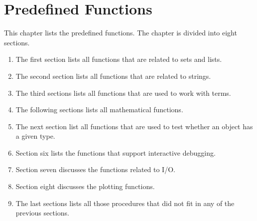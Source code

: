 \chapter{Predefined Functions}
This chapter lists  the predefined functions.  The chapter is divided into eight
sections.
\begin{enumerate}
\item The first section lists all functions that are related to sets and lists.
\item The second section lists all functions that are related to strings.
\item The third sections lists all functions that are used to work with terms.
\item The following sections lists all mathematical functions.
\item The next section list all functions that are used to test whether an object has a
      given type.
\item Section six lists the functions that support interactive debugging.
\item Section seven discusses the functions related to I/O.
\item Section eight discusses the plotting functions.
\item The last sections lists all those procedures that did not fit in 
      any of the previous sections.  
\end{enumerate}

